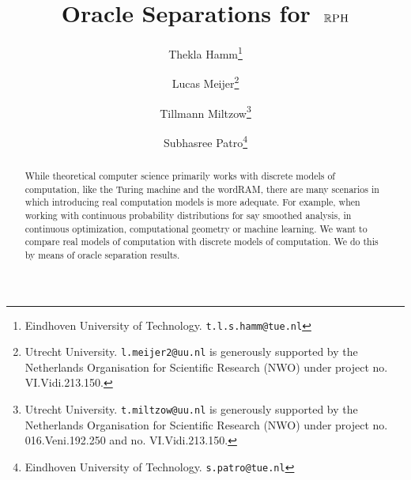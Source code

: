 \documentclass{article}
\title{Oracle Separations for~$\mathbb{R}\textsc{PH}$}
\author{Thekla Hamm\thanks{Eindhoven University of Technology. {\tt t.l.s.hamm@tue.nl}}
\and
Lucas Meijer\thanks{Utrecht University. {\tt l.meijer2@uu.nl} is generously supported by the Netherlands Organisation for Scientific Research (NWO) under project no. VI.Vidi.213.150.}
\and 
Tillmann Miltzow\thanks{Utrecht University. {\tt t.miltzow@uu.nl} is generously supported by the Netherlands Organisation for Scientific Research (NWO) under project no. 016.Veni.192.250 and no. VI.Vidi.213.150.}
\and 
Subhasree Patro\thanks{Eindhoven University of Technology. {\tt s.patro@tue.nl}}}
\date{}
\begin{document}
% 
\maketitle

\begin{abstract}
    While theoretical computer science primarily works with discrete models of computation, like the Turing machine and the wordRAM, there are many scenarios in which introducing real computation models is more adequate.
    For example, when working with continuous probability distributions for say smoothed analysis, in continuous optimization, computational geometry or machine learning.
    We want to compare real models of computation with discrete models of computation. 
    We do this by means of oracle separation results.
    

\end{abstract}
\end{document}
